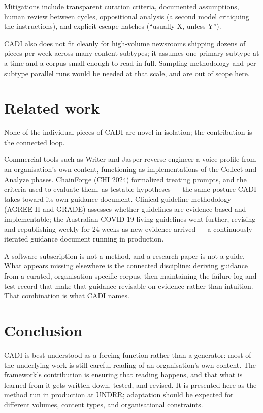 \documentclass[11pt]{article}
\begin{document}
Mitigations include transparent curation criteria, documented
assumptions, human review between cycles, oppositional analysis (a
second model critiquing the instructions), and explicit escape hatches
(``usually X, unless Y'').

CADI also does not fit cleanly for high-volume newsrooms shipping
dozens of pieces per week across many content subtypes; it assumes one
primary subtype at a time and a corpus small enough to read in full.
Sampling methodology and per-subtype parallel runs would be needed at
that scale, and are out of scope here.

\section{Related work}

None of the individual pieces of CADI are novel in isolation; the
contribution is the connected loop.

Commercial tools such as Writer and Jasper reverse-engineer a voice
profile from an organisation's own content, functioning as
implementations of the Collect and Analyze phases. ChainForge (CHI
2024) formalized treating prompts, and the criteria used to evaluate
them, as testable hypotheses --- the same posture CADI takes toward
its own guidance document. Clinical guideline methodology (AGREE II
and GRADE) assesses whether guidelines are evidence-based and
implementable; the Australian COVID-19 living guidelines went further,
revising and republishing weekly for 24 weeks as new evidence arrived
--- a continuously iterated guidance document running in production.

A software subscription is not a method, and a research paper is not a
guide. What appears missing elsewhere is the connected discipline:
deriving guidance from a curated, organisation-specific corpus, then
maintaining the failure log and test record that make that guidance
revisable on evidence rather than intuition. That combination is what
CADI names.

\section{Conclusion}

CADI is best understood as a forcing function rather than a generator:
most of the underlying work is still careful reading of an
organisation's own content. The framework's contribution is ensuring
that reading happens, and that what is learned from it gets written
down, tested, and revised. It is presented here as the method run
in production at UNDRR; adaptation should be expected for different
volumes, content types, and organisational constraints.
\end{document}
